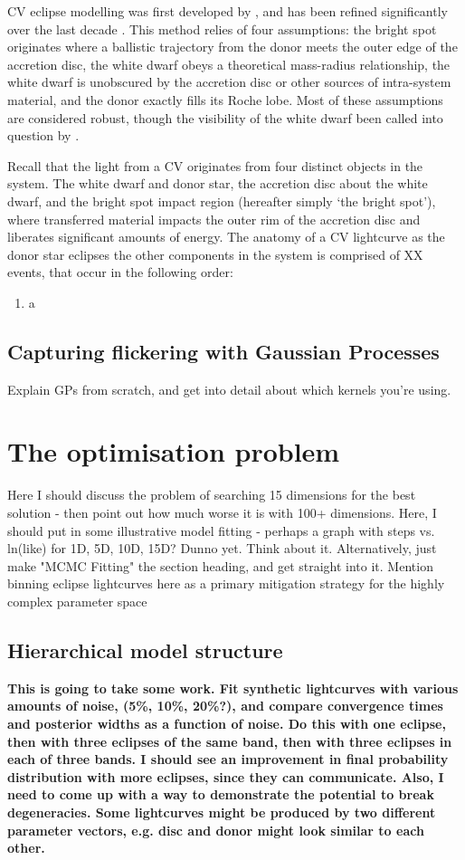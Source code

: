 CV eclipse modelling was first developed by \citet{wood1986}, and has been refined significantly over the last decade \citep{Savoury2011, McAllister2017, McAllister2019}. This method relies of four assumptions: the bright spot originates where a ballistic trajectory from the donor meets the outer edge of the accretion disc, the white dwarf obeys a theoretical mass-radius relationship, the white dwarf is unobscured by the accretion disc or other sources of intra-system material, and the donor exactly fills its Roche lobe. Most of these assumptions are considered robust, though the visibility of the white dwarf been called into question by \citet{Spark2015}.

Recall that the light from a CV originates from four distinct objects in the system. The white dwarf and donor star, the accretion disc about the white dwarf, and the bright spot impact region (hereafter simply `the bright spot'), where transferred material impacts the outer rim of the accretion disc and liberates significant amounts of energy.
The anatomy of a CV lightcurve as the donor star eclipses the other components in the system is comprised of XX events, that occur in the following order:
\begin{enumerate}
    \item a 
\end{enumerate}



\subsection{Capturing flickering with Gaussian Processes}
Explain GPs from scratch, and get into detail about which kernels you're using. 


\section{The optimisation problem}
Here I should discuss the problem of searching 15 dimensions for the best solution - then point out how much worse it is with 100+ dimensions. Here, I should put in some illustrative model fitting - perhaps a graph with steps vs. ln(like) for 1D, 5D, 10D, 15D? Dunno yet. Think about it. Alternatively, just make "MCMC Fitting" the section heading, and get straight into it. Mention binning eclipse lightcurves here as a primary mitigation strategy for the highly complex parameter space


\subsection{Hierarchical model structure}
{\bf This is going to take some work. Fit synthetic lightcurves with various amounts of noise, (5\%, 10\%, 20\%?), and compare convergence times and posterior widths as a function of noise. Do this with one eclipse, then with three eclipses of the same band, then with three eclipses in each of three bands.
I should see an improvement in final probability distribution with more eclipses, since they can communicate.
Also, I need to come up with a way to demonstrate the potential to break degeneracies. Some lightcurves might be produced by two different parameter vectors, e.g. disc and donor might look similar to each other. }

